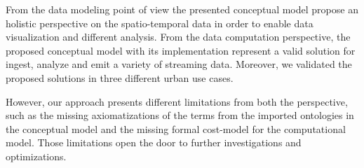 From the data modeling point of view the presented conceptual model propose an holistic perspective on the spatio-temporal data in order to enable data visualization and different analysis.
From the data computation perspective, the proposed conceptual model with its implementation represent a valid solution for ingest, analyze and emit a variety of streaming data.
Moreover, we validated the proposed solutions in three different urban use cases.

However, our approach presents different limitations from both the perspective, such as the missing axiomatizations of the terms from the imported ontologies in the conceptual model and the missing formal cost-model for the computational model.
Those limitations open the door to further investigations and optimizations.
